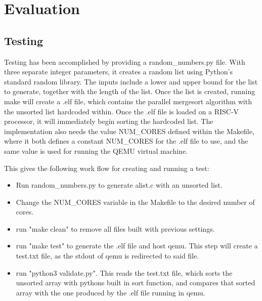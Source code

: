 \section{Evaluation}

\subsection{Testing}
Testing has been accomplished by providing a random\_numbers.py file. With three
separate integer parameters, it creates a random list using Python's standard
random library. The inputs include a lower and upper bound for the list to
generate, together with the length of the list. Once the list is created,
running make will create a .elf file, which contains the parallel mergesort
algorithm with the unsorted list hardcoded within. Once the .elf file is loaded
on a RISC-V processor, it will immediately begin sorting the hardcoded list. The
implementation also needs the value NUM\_CORES defined within the Makefile, where
it both defines a constant NUM\_CORES for the .elf file to use, and the same
value is used for running the QEMU virtual machine.

This gives the following work flow for creating and running a test:
\begin{itemize}
  \item Run random\_numbers.py to generate alist.c with an unsorted list.
  \item Change the NUM\_CORES variable in the Makefile to the desired number of
    cores.
  \item run "make clean" to remove all files built with previous settings.
  \item run "make test" to generate the .elf file and host qemu. This step will
    create a test.txt file, as the stdout of qemu is redirected to said file.
  \item run "python3 validate.py". This reads the test.txt file, which sorts the
    unsorted array with pythons built in sort function, and compares that sorted
    array with the one produced by the .elf file running in qemu.
\end{itemize}


